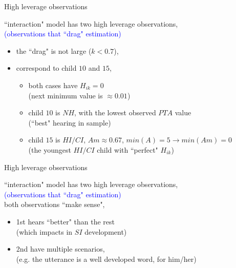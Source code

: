 %
%
\begin{lhframe}[rhgraphic={\texttt{[image: outliers.pdf]}}]
	{High leverage observations}
	
	``interaction" model has two high leverage observations, \\
	{\small \textcolor{blue}{(observations that ``drag" estimation)} }
	\begin{itemize}
		\item the ``drag" is not large ($k<0.7$),
		\item correspond to child $10$ and $15$,
		\begin{itemize}
			\item both cases have $H_{ik}=0$ \\
			{\small (next minimum value is $\approx 0.01$)}
			\item child $10$ is $NH$, with the lowest observed $PTA$ value \\
			{\small (``best" hearing in sample) }
			\item child $15$ is $HI/CI$, $Am \approx 0.67$, $min(A)=5 \rightarrow min(Am)=0$ \\
			{\small (the youngest $HI/CI$ child with ``perfect" $H_{ik}$)} \\
		\end{itemize}
	\end{itemize}
\end{lhframe}
%
%
\begin{lhframe}[rhgraphic={\texttt{[image: outliers.pdf]}}]
	{High leverage observations}
	
	``interaction" model has two high leverage observations, \\
	{\small \textcolor{blue}{(observations that ``drag" estimation)} } \\ 
	
	both observations ``make sense",
	\begin{itemize}
		\item 1st hears ``better" than the rest \\
		{\small (which impacts in $SI$ development) }
		\item 2nd have multiple scenarios, \\
		{\small (e.g. the utterance is a well developed word, for him/her)}
	\end{itemize}
\end{lhframe}
%
%
